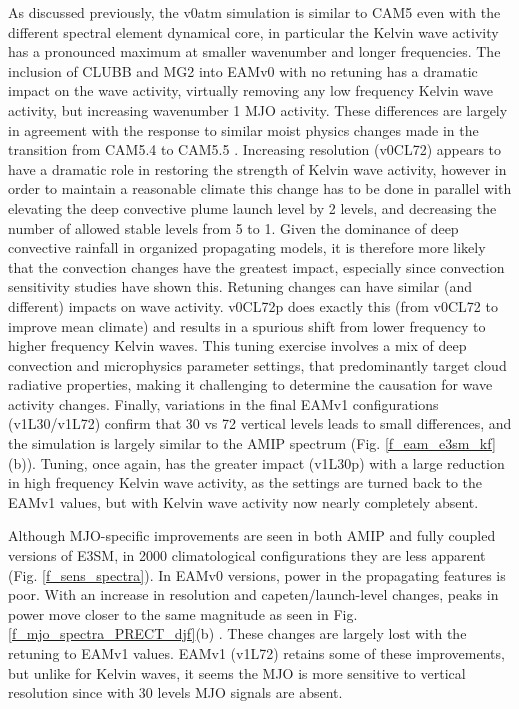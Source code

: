 \documentclass[draft,ms]{AGUTeX}
\begin{document}
\begin{article}
As discussed previously, the v0atm simulation is similar to CAM5 even with the different spectral element dynamical core, in particular the Kelvin wave activity has a pronounced maximum at smaller wavenumber and longer frequencies. The inclusion of CLUBB and MG2 into EAMv0 with no retuning has a dramatic impact on the wave activity, virtually removing any low frequency Kelvin wave activity, but increasing wavenumber 1 MJO activity. These differences are largely in agreement with the response to similar moist physics changes made in the transition from CAM5.4 to CAM5.5 \citep{Bogenschutz2018}. Increasing resolution (v0CL72) appears to have a dramatic role in restoring the strength of Kelvin wave activity, however in order to maintain a reasonable climate this change has to be done in parallel with elevating the deep convective plume launch level by 2 levels, and decreasing the number of allowed stable levels from 5 to 1. Given the dominance of deep convective rainfall in organized propagating models, it is therefore more likely that the convection changes have the greatest impact, especially since convection sensitivity studies \citep[e.g.,][]{Kim2011} have shown this. Retuning changes can have similar (and different) impacts on wave activity. v0CL72p does exactly this (from v0CL72 to improve mean climate) and results in a spurious shift from lower frequency to higher frequency Kelvin waves. This tuning exercise involves a mix of deep convection and microphysics parameter settings, that predominantly target cloud radiative properties, making it challenging to determine the causation for wave activity changes. Finally, variations in the final EAMv1 configurations (v1L30/v1L72) confirm that 30 vs 72 vertical levels leads to small differences, and the simulation is largely similar to the AMIP spectrum (Fig. \ref{f_eam_e3sm_kf} (b)). Tuning, once again, has the greater impact (v1L30p) with a large reduction in high frequency Kelvin wave activity, as the settings are turned back to the EAMv1 values, but with Kelvin wave activity now nearly completely absent.

Although MJO-specific improvements are seen in both AMIP and fully coupled versions of E3SM, in 2000 climatological configurations they are less apparent (Fig. \ref{f_sens_spectra}). In EAMv0 versions, power in the propagating features is poor. With an increase in resolution and capeten/launch-level changes, peaks in power move closer to the same magnitude as seen in Fig. \ref{f_mjo_spectra_PRECT_djf}(b) . These changes are largely lost with the retuning to EAMv1 values. EAMv1 (v1L72) retains some of these improvements, but unlike for Kelvin waves, it seems the MJO is more sensitive to vertical resolution since with 30 levels MJO signals are absent.


\end{article}
\end{document}
